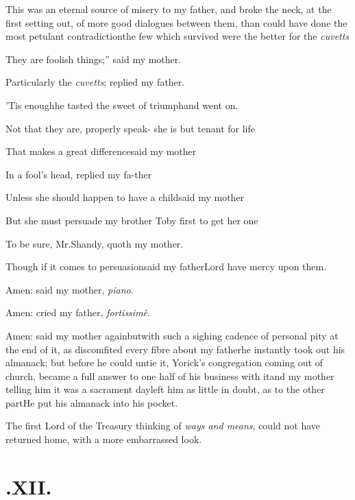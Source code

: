 \documentclass{article}
\begin{document}
This was an eternal source of misery to my father, and broke the
neck, at the first setting out, of more good dialogues between
them, than could have done the most petulant
contradiction\tsh the few which survived were the better
for the \textit{cuvetts}\tsh

\tsk \lqq They are foolish things;” said my
mother.

\tsh Particularly the \textit{cuvetts}; replied my
father.

’Tis enough\tsk he tasted the sweet of triumph\tsk and
went on.

\tsk Not that they are, properly speak-\break
{}
she is but tenant for life\tsh{}

\tsh That makes a great difference\tsk\break said my
mother\tsh

\tsk In a fool’s head, replied my fa-\break ther\tsh

Unless she should happen to have a child\tsk said my
mother\tsh

\tsh But she must persuade my brother Toby first
to get her one\tsk

\tsh To be sure, Mr.\@ Shandy, quoth my mother.

\tsh Though if it comes to persuasion\break\tsk said my
father\tsk Lord have mercy upon them.

Amen: said my mother, \textit{piano}.

Amen: cried my father, \textit{fortissimè}.

Amen: said my mother again\tsk but\break with such a sighing
cadence of personal pity at the end of it, as discomfited every
fibre about my father\tsk he instantly took out his almanack; but
before he could untie it, Yorick’s congregation coming
out of church, became a full answer to one half of his business
with it\tsk and my mother telling him it was a sacrament day\tsk left
him as little in doubt, as to the other part\tsk He put his
almanack into his pocket.

The first Lord of the Treasury thinking of \textit{ways and
means}, could not have returned home, with a more embarrassed
look.

\vfill{}\eject
\null{}\baselineskip
\section{.\enspace XII.}
\end{document}
